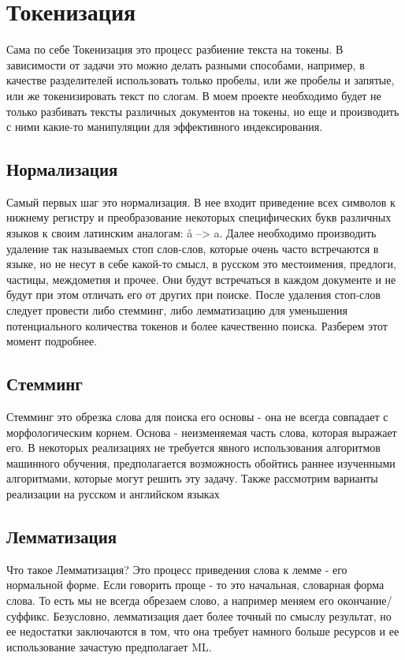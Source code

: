 \section{Токенизация}
Сама по себе Токенизация это процесс разбиение текста на токены. В зависимости от задачи это можно делать разными 
способами, например, в качестве разделителей использовать только пробелы, или же пробелы и запятые, или же 
токенизировать текст по слогам. В моем проекте необходимо будет не только разбивать тексты различных документов на 
токены, но еще и производить с ними какие-то манипуляции для эффективного индексирования. 

\subsection{Нормализация}
Самый первых шаг это нормализация. В нее входит приведение всех символов к нижнему регистру и преобразование некоторых 
специфических букв различных языков к своим латинским аналогам: å --> a. Далее необходимо производить удаление так 
называемых стоп слов-слов, которые очень часто встречаются в языке, но не несут в себе какой-то смысл, в русском это 
местоимения, предлоги, частицы, междометия и прочее. Они будут встречаться в каждом документе и не будут при этом 
отличать его от других при поиске. После удаления стоп-слов следует провести либо стемминг, либо лемматизацию для 
уменьшения потенциального количества токенов и более качественно поиска. Разберем этот момент подробнее. 

\subsection{Стемминг}
Стемминг это обрезка слова для поиска его основы - она не всегда совпадает с 
морфологическим корнем. Основа - неизменяемая часть слова, которая выражает его. В некоторых реализациях не требуется явного 
использования алгоритмов машинного обучения, 
предполагается возможность обойтись раннее изученными алгоритмами, которые могут решить эту задачу.
Также рассмотрим варианты реализации на русском и английском языках

\subsection{Лемматизация}
Что такое Лемматизация? Это процесс приведения слова к лемме - его нормальной форме. Если говорить проще - то 
это начальная, словарная форма слова. То есть мы не всегда обрезаем слово, а например меняем его окончание/суффикс. 
Безусловно, лемматизация дает более точный по смыслу результат, но ее недостатки заключаются в том, что она требует 
намного больше ресурсов и ее использование зачастую предполагает ML. 

